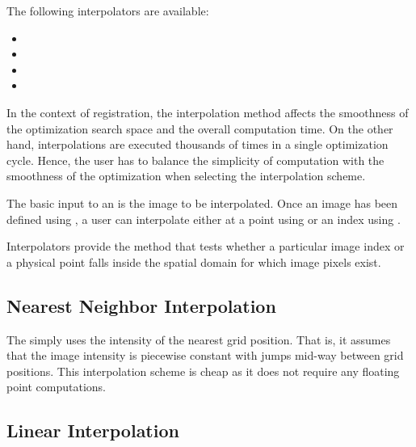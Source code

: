 The following interpolators are available:

\begin{itemize}
\item {}
\item {}
\item {}
\item {}
\end{itemize}

In the context of registration, the interpolation method affects the smoothness
of the optimization search space and the overall computation time. On the other
hand, interpolations are executed thousands of times in a single optimization
cycle. Hence, the user has to balance the simplicity of computation with the
smoothness of the optimization when selecting the interpolation scheme.


The basic input to an  is the image to
be interpolated. Once an image has been defined using ,
a user can interpolate either at a point using  or
an index using .
 
Interpolators provide the method  that tests whether a
particular image index or a physical point falls inside the spatial domain for
which image pixels exist.

\subsection{Nearest Neighbor Interpolation}
\label{sec:NearestNeighborInterpolation}
The  simply uses the
intensity of the nearest grid position. That is, it assumes that the image
intensity is piecewise constant with jumps mid-way between grid positions.
This interpolation scheme is cheap as it does not require any floating point
computations.


\subsection{Linear Interpolation}
\label{sec:LinearInterpolation}


